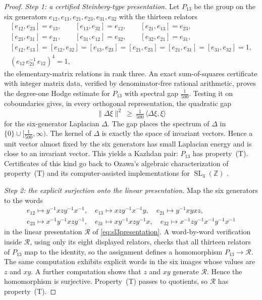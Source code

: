 \documentclass[11pt]{amsart}
\theoremstyle{definition}
\theoremstyle{remark}
\theoremstyle{plain}
\newcommand{\SL}{\operatorname{SL}}
\begin{document}
\begin{proof}
\emph{Step 1: a certified Steinberg-type presentation.}  Let $P_{13}$ be
the group on the six generators
$e_{12},e_{13},e_{21},e_{23},e_{31},e_{32}$ with the thirteen relators
\[
\begin{gathered}
 [e_{12},e_{23}]=e_{13},\qquad [e_{13},e_{32}]=e_{12},\qquad
 [e_{21},e_{13}]=e_{23},\\
 [e_{23},e_{31}]=e_{21},\qquad [e_{31},e_{12}]=e_{32},\qquad
 [e_{32},e_{21}]=e_{31},\\
 [e_{12},e_{13}]=[e_{12},e_{32}]=[e_{13},e_{23}]
 =[e_{21},e_{23}]=[e_{21},e_{31}]=[e_{31},e_{32}]=1,\\
 (e_{12}\,e_{21}^{-1}\,e_{12})^{4}=1,
\end{gathered}
\]
the elementary-matrix relations in rank three.  An exact sum-of-squares
certificate with integer matrix data, verified by denominator-free
rational arithmetic, proves the degree-one Hodge estimate for $P_{13}$
with spectral gap $\tfrac1{500}$.  Testing it on coboundaries gives, in
every orthogonal representation, the quadratic gap
\[
 \lVert\Delta\xi\rVert^2\ \ge\ \tfrac1{500}\,\langle\Delta\xi,\xi\rangle
\]
for the six-generator Laplacian $\Delta$.  The gap places the spectrum
of $\Delta$ in $\{0\}\cup[\tfrac1{500},\infty)$.  The kernel of
$\Delta$ is exactly the space of invariant vectors.  Hence a unit
vector almost fixed by the six generators has small Laplacian energy
and is close to an invariant vector.  This yields a Kazhdan pair: $P_{13}$ has
property~\textup{(T)}.  Certificates of this kind go back to Ozawa's
algebraic characterization of property~\textup{(T)} \cite{Ozawa} and its
computer-assisted implementations for $\SL_3(\mathbb Z)$
\cite{NetzerThom}.

\emph{Step 2: the explicit surjection onto the linear presentation.}
Map the six generators to the words
\[
\begin{gathered}
 e_{12}\mapsto y^{-1}xzy^{-1}x^{-1},\quad
 e_{13}\mapsto xzy^{-1}x^{-1}y,\quad
 e_{21}\mapsto y^{-1}xyxz,\\
 e_{23}\mapsto x^{-1}y^{-1}xzy^{-1},\quad
 e_{31}\mapsto xy^{-1}xzy^{-1}x,\quad
 e_{32}\mapsto x^{-1}zy^{-1}x^{-1}y^{-1}x^{-1}
\end{gathered}
\]
in the linear presentation $\mathcal R$ of \eqref{eq:sl3presentation}.
A word-by-word verification inside $\mathcal R$, using only its eight
displayed relators, checks that all thirteen relators of $P_{13}$ map to
the identity, so the assignment defines a homomorphism
$P_{13}\to\mathcal R$.  The same computation exhibits explicit words in
the six images whose values are $z$ and $xy$.  A further computation
shows that $z$ and $xy$ generate $\mathcal R$.  Hence the homomorphism
is surjective.
Property~\textup{(T)} passes to quotients, so $\mathcal R$ has
property~\textup{(T)}.


\end{proof}
\end{document}
